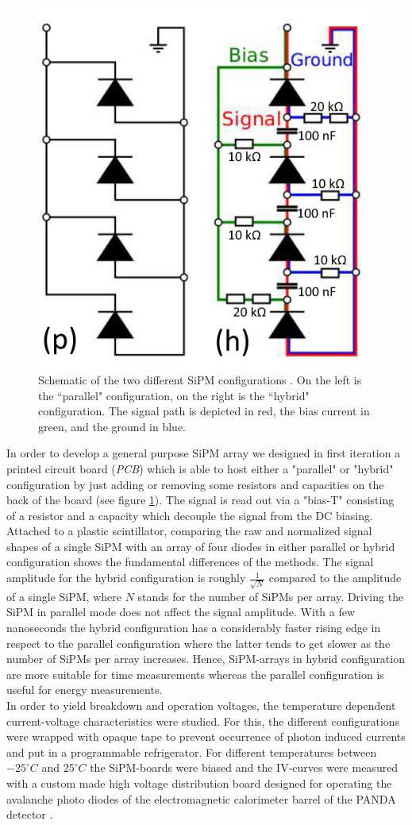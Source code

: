 \documentclass[12pt]{article}
\newcommand{\tit}[1]{\textit{#1}}
\begin{document}
\begin{figure}[b!]
	\centering
	\includegraphics[width=0.5\linewidth]{./graphics/ch4/circuits.PNG}
	\caption{ Schematic of the two different SiPM configurations \cite{sebastian}. On the left is the ``parallel" configuration, on the right is the ``hybrid" configuration. The signal path is depicted in red, the bias current in green, and the ground in blue.  }
	\label{fig:PCB}
\end{figure}
In order to develop a general purpose SiPM array we designed in first iteration a printed circuit board (\tit{PCB}) which is able to host either a "parallel" or "hybrid" configuration by just adding or removing some resistors and capacities on the back of the board (see figure \ref{fig:PCB}). The signal is read out via a "bias-T" consisting of a resistor and a capacity which decouple the signal from the DC biasing.  \\ \indent
Attached to a plastic scintillator, comparing the raw and normalized signal shapes of a single SiPM with an array of four diodes in either parallel or hybrid configuration shows the fundamental differences of the methods. The signal amplitude for the hybrid configuration is roughly $\frac{1}{\sqrt{N}}$ compared to the amplitude of a single SiPM, where $N$ stands for the number of SiPMs per array. Driving the SiPM in parallel mode does not affect the signal amplitude. With a few nanoseconds the hybrid configuration has a considerably faster rising edge in respect to the parallel configuration where the latter tends to get slower as the number of SiPMs per array increases. Hence, SiPM-arrays in hybrid configuration are more suitable for time measurements whereas the parallel configuration is useful for energy measurements. \\ \indent
In order to yield breakdown and operation voltages, the temperature dependent current-voltage characteristics were studied. For this, the different configurations were wrapped with opaque tape to prevent occurrence of photon induced currents and put in a programmable refrigerator. For different temperatures between $-25^{\circ}C $ and $25^{\circ}C$ the SiPM-boards were biased and the IV-curves were measured with a custom made high voltage distribution board designed for operating the avalanche photo diodes of the electromagnetic calorimeter barrel of the PANDA detector \cite{chris}. \\ \indent
\end{document}
